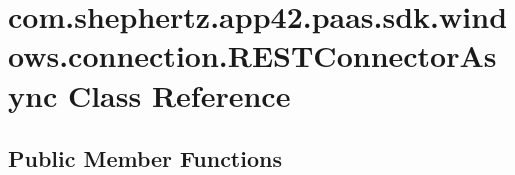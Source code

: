 \hypertarget{classcom_1_1shephertz_1_1app42_1_1paas_1_1sdk_1_1windows_1_1connection_1_1_r_e_s_t_connector_async}{\section{com.\+shephertz.\+app42.\+paas.\+sdk.\+windows.\+connection.\+R\+E\+S\+T\+Connector\+Async Class Reference}
\label{classcom_1_1shephertz_1_1app42_1_1paas_1_1sdk_1_1windows_1_1connection_1_1_r_e_s_t_connector_async}
}
\subsection*{Public Member Functions}
